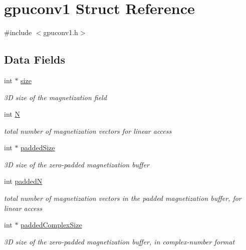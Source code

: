 \hypertarget{structgpuconv1}{
\section{gpuconv1 Struct Reference}
\label{structgpuconv1}
}


{\ttfamily \#include $<$gpuconv1.h$>$}

\subsection*{Data Fields}
\begin{DoxyCompactItemize}
\item 
int $\ast$ \hyperlink{structgpuconv1_a8d75f07579c54db1a3930c3a5aca64ed}{size}
\begin{DoxyCompactList}\small\item\em 3D size of the magnetization field \item\end{DoxyCompactList}\item 
int \hyperlink{structgpuconv1_a1ba1a0d9be30864cbdc05a94ac43f747}{N}
\begin{DoxyCompactList}\small\item\em total number of magnetization vectors for linear access \item\end{DoxyCompactList}\item 
int $\ast$ \hyperlink{structgpuconv1_a5039ec622cc217c4ba86b85b394a7cfa}{paddedSize}
\begin{DoxyCompactList}\small\item\em 3D size of the zero-\/padded magnetization buffer \item\end{DoxyCompactList}\item 
int \hyperlink{structgpuconv1_a215ec34d5e22137ac25b7b89c6c08e77}{paddedN}
\begin{DoxyCompactList}\small\item\em total number of magnetization vectors in the padded magnetization buffer, for linear access \item\end{DoxyCompactList}\item 
int $\ast$ \hyperlink{structgpuconv1_a85e7af21492a5af71523d8007a999381}{paddedComplexSize}
\begin{DoxyCompactList}\small\item\em 3D size of the zero-\/padded magnetization buffer, in complex-\/number format \item\end{DoxyCompactList}\item 

\end{DoxyCompactItemize}
